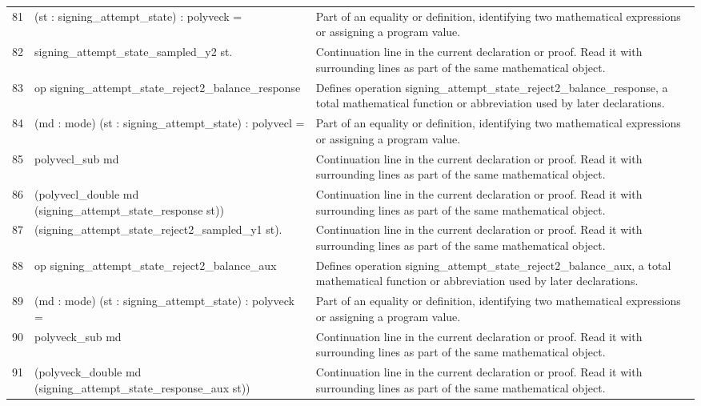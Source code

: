 \documentclass[10pt]{article}
\begin{document}
\begin{longtable}{r L{0.53\textwidth} L{0.37\textwidth}}
81 & {\ttfamily\scriptsize    (st : signing\_attempt\_state) : polyveck =} & Part of an equality or definition, identifying two mathematical expressions or assigning a program value. \\
82 & {\ttfamily\scriptsize   signing\_attempt\_state\_sampled\_y2 st.} & Continuation line in the current declaration or proof.  Read it with surrounding lines as part of the same mathematical object. \\
83 & {\ttfamily\scriptsize op signing\_attempt\_state\_reject2\_balance\_response} & Defines operation signing\_attempt\_state\_reject2\_balance\_response, a total mathematical function or abbreviation used by later declarations. \\
84 & {\ttfamily\scriptsize    (md : mode) (st : signing\_attempt\_state) : polyvecl =} & Part of an equality or definition, identifying two mathematical expressions or assigning a program value. \\
85 & {\ttfamily\scriptsize   polyvecl\_sub md} & Continuation line in the current declaration or proof.  Read it with surrounding lines as part of the same mathematical object. \\
86 & {\ttfamily\scriptsize     (polyvecl\_double md (signing\_attempt\_state\_response st))} & Continuation line in the current declaration or proof.  Read it with surrounding lines as part of the same mathematical object. \\
87 & {\ttfamily\scriptsize     (signing\_attempt\_state\_reject2\_sampled\_y1 st).} & Continuation line in the current declaration or proof.  Read it with surrounding lines as part of the same mathematical object. \\
88 & {\ttfamily\scriptsize op signing\_attempt\_state\_reject2\_balance\_aux} & Defines operation signing\_attempt\_state\_reject2\_balance\_aux, a total mathematical function or abbreviation used by later declarations. \\
89 & {\ttfamily\scriptsize    (md : mode) (st : signing\_attempt\_state) : polyveck =} & Part of an equality or definition, identifying two mathematical expressions or assigning a program value. \\
90 & {\ttfamily\scriptsize   polyveck\_sub md} & Continuation line in the current declaration or proof.  Read it with surrounding lines as part of the same mathematical object. \\
91 & {\ttfamily\scriptsize     (polyveck\_double md (signing\_attempt\_state\_response\_aux st))} & Continuation line in the current declaration or proof.  Read it with surrounding lines as part of the same mathematical object. \\

\end{longtable}
\end{document}
